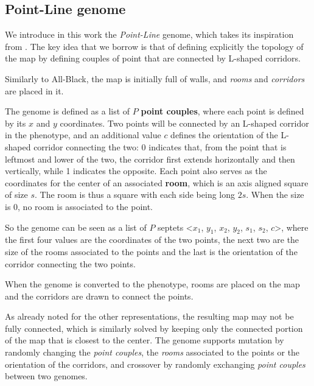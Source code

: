 \documentclass{Configuration_Files/PoliMi3i_thesis}
\begin{document}
\subsection{Point-Line genome}
\label{subsec:point_line}

We introduce in this work the \textit{Point-Line} genome, which takes its inspiration from \citet{olsted_interactive_2015}. The key idea that we borrow is that of defining explicitly the topology of the map by defining couples of point that are connected by L-shaped corridors.

Similarly to All-Black, the map is initially full of walls, and \textit{rooms} and \textit{corridors} are placed in it. 

The genome is defined as a list of $P$ \textbf{point couples}, where each point is defined by its $x$ and $y$ coordinates. Two points will be connected by an L-shaped corridor in the phenotype, and an additional value $c$ defines the orientation of the L-shaped corridor connecting the two: 0 indicates that, from the point that is leftmost and lower of the two, the corridor first extends horizontally and then vertically, while 1 indicates the opposite. Each point also serves as the coordinates for the center of an associated \textbf{room}, which is an axis aligned square of size $s$. The room is thus a square with each side being long $2s$. When the size is 0, no room is associated to the point.

So the genome can be seen as a list of $P$ septets <$x_1$, $y_1$, $x_2$, $y_2$, $s_1$, $s_2$, $c$>, where the first four values are the coordinates of the two points, the next two are the size of the rooms associated to the points and the last is the orientation of the corridor connecting the two points. 

When the genome is converted to the phenotype, rooms are placed on the map and the corridors are drawn to connect the points. 

As already noted for the other representations, the resulting map may not be fully connected, which is similarly solved by keeping only the connected portion of the map that is closest to the center. The genome supports mutation by randomly changing the \textit{point couples}, the \textit{rooms} associated to the points or the orientation of the corridors, and crossover by randomly exchanging \textit{point couples} between two genomes.
\end{document}
